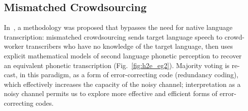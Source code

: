 \subsection{Mismatched Crowdsourcing}
\label{sec:bgmc}

In~\cite{JHJ15a}, a methodology was proposed that bypasses the need
for native language transcription: mismatched crowdsourcing sends target
language speech to crowd-worker transcribers who have no
knowledge of the target language, then uses explicit mathematical
models of second language phonetic perception to recover an equivalent
phonetic transcription (Fig.~\ref{fig:h2e_eg2}).  Majority voting is
re-cast, in this paradigm, as a form of error-correcting code
(redundancy coding), which effectively increases the capacity of the
noisy channel; interpretation as a noisy channel permits us to explore
more effective and efficient forms of error-correcting codes.

